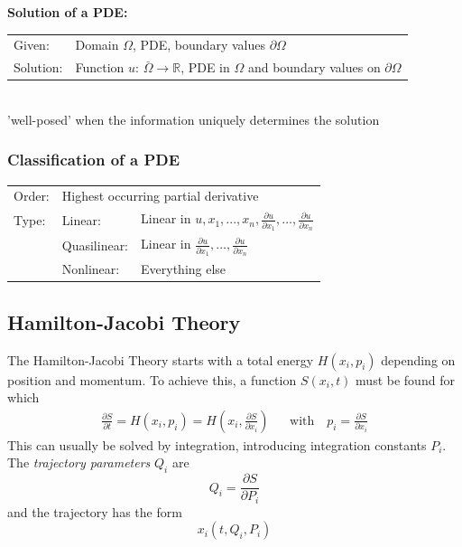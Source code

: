 \textbf{Solution of a PDE:}\\
\begin{tabular}{ll}
Given:& Domain $\Omega$, PDE, boundary values $\partial\Omega$\\
Solution:& Function $u$: $\overset{\_}{\Omega}\rightarrow \mathbb{R}$, PDE in $\Omega$ and boundary values on $\partial\Omega$\\
\end{tabular} \\
'well-posed' when the information uniquely determines the solution

\subsubsection{Classification of a PDE}
\begin{tabular}{lll}
Order:& \multicolumn{2}{l}{Highest occurring partial derivative}\\
Type:& Linear: & Linear in $u, x_1,...,x_n, \frac{\partial u}{\partial x_1},\ldots,\frac{\partial u}{\partial x_n}$\\
& Quasilinear: & Linear in $\frac{\partial u}{\partial x_1},\ldots,\frac{\partial u}{\partial x_n}$\\
& Nonlinear: & Everything else
\end{tabular}




\subsection{Hamilton-Jacobi Theory}
The Hamilton-Jacobi Theory starts with a total energy $H(x_i,p_i)$ depending on position and momentum. To achieve this, a function $S(x_i,t)$ must be found for which
\begin{align*}
\frac{\partial S}{\partial t} = H\left(x_i,p_i\right) = H\left(x_i,\frac{\partial S}{\partial x_i}\right)
&& \text{with} \quad
p_i = \frac{\partial S}{\partial x_i}
\end{align*}
This can usually be solved by integration, introducing integration constants $P_i$.
The \emph{trajectory parameters} $Q_i$ are
\[
    Q_i = \frac{\partial S}{\partial P_i}
\]
and the trajectory has the form
\[
    x_i(t,Q_i,P_i)
\]





%

